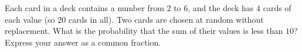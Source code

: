 Each card in a deck contains a number from $2$ to $6$, and the deck has $4$ cards of each value (so $20$ cards in all). Two cards are chosen at random without replacement. What is the probability that the sum of their values is less than $10$? Express your answer as a common fraction.
